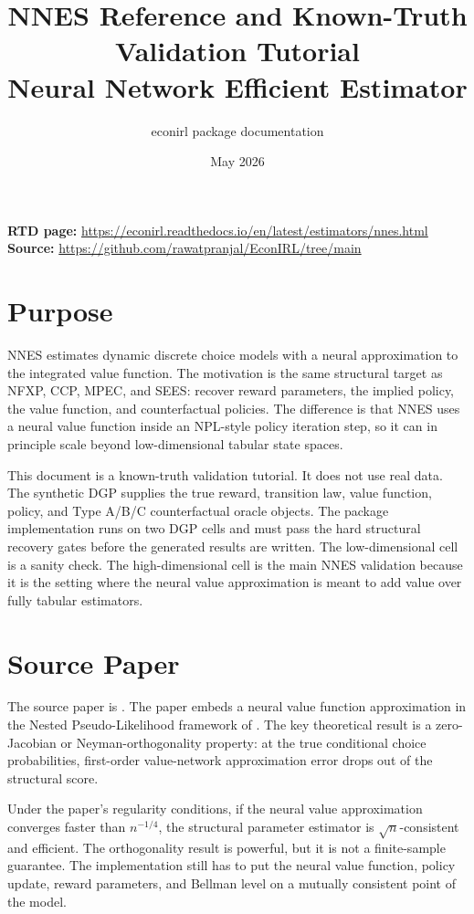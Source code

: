 \documentclass[10pt]{article}
\title{NNES Reference and Known-Truth Validation Tutorial\\[3pt]
\large Neural Network Efficient Estimator}
\author{econirl package documentation}
\date{May 2026}
\begin{document}
\maketitle

\begin{center}
\small
\textbf{RTD page:}
\url{https://econirl.readthedocs.io/en/latest/estimators/nnes.html}
\quad
\textbf{Source:}
\url{https://github.com/rawatpranjal/EconIRL/tree/main}
\end{center}

\section{Purpose}

NNES estimates dynamic discrete choice models with a neural approximation to
the integrated value function. The motivation is the same structural target as
NFXP, CCP, MPEC, and SEES: recover reward parameters, the implied policy, the
value function, and counterfactual policies. The difference is that NNES uses a
neural value function inside an NPL-style policy iteration step, so it can in
principle scale beyond low-dimensional tabular state spaces.

This document is a known-truth validation tutorial. It does not use real data.
The synthetic DGP supplies the true reward, transition law, value function,
policy, and Type A/B/C counterfactual oracle objects. The package
implementation runs on two DGP cells and must pass the hard structural recovery
gates before the generated results are written. The low-dimensional cell is a
sanity check. The high-dimensional cell is the main NNES validation because it
is the setting where the neural value approximation is meant to add value over
fully tabular estimators.

\section{Source Paper}

The source paper is \citet{nguyen2025}. The paper embeds a neural value
function approximation in the Nested Pseudo-Likelihood framework of
\citet{aguirregabiriaMira2002}. The key theoretical result is a zero-Jacobian
or Neyman-orthogonality property: at the true conditional choice
probabilities, first-order value-network approximation error drops out of the
structural score.

Under the paper's regularity conditions, if the neural value approximation
converges faster than \(n^{-1/4}\), the structural parameter estimator is
\(\sqrt n\)-consistent and efficient. The orthogonality result is powerful,
but it is not a finite-sample guarantee. The implementation still has to put
the neural value function, policy update, reward parameters, and Bellman level
on a mutually consistent point of the model.
\end{document}
